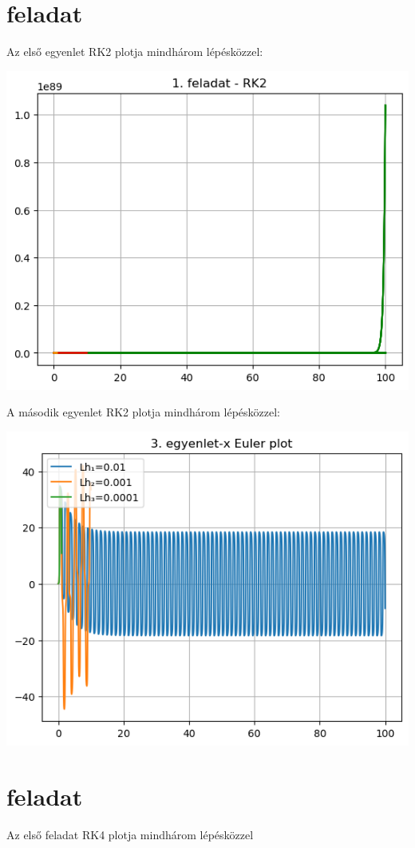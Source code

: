 \documentclass{article}
\begin{document}
\section{feladat}
Az első egyenlet RK2 plotja mindhárom lépésközzel:

\includegraphics[scale=1]{../plot_9.png} 

A második egyenlet RK2 plotja mindhárom lépésközzel:

\includegraphics[scale=1]{../plot_5.png} 

\section{feladat}
Az első feladat RK4 plotja mindhárom lépésközzel
\end{document}
